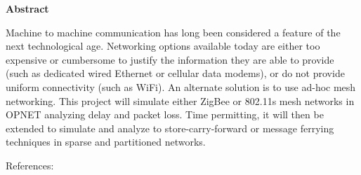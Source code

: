 \begin{center}
\textbf{Abstract}
\end{center}

Machine to machine communication has long been considered a feature of the next technological age. 
Networking options available today are either too expensive or cumbersome to justify the information they are able to provide (such as dedicated wired Ethernet or cellular data modems), or do not provide uniform connectivity (such as WiFi). 
An alternate solution is to use ad-hoc mesh networking. 
This project will simulate either ZigBee or 802.11s mesh networks in OPNET analyzing delay and packet loss. 
Time permitting, it will then be extended to simulate and analyze to store-carry-forward or message ferrying techniques in sparse and partitioned networks.

References: 
~\cite{adhocmsgferry}
~\cite{hybrid}
~\cite{Routing}
~\cite{wearable}
~\cite{QoSrouting}
~\cite{efficientrouting}
~\cite{implement}
~\cite{book1}